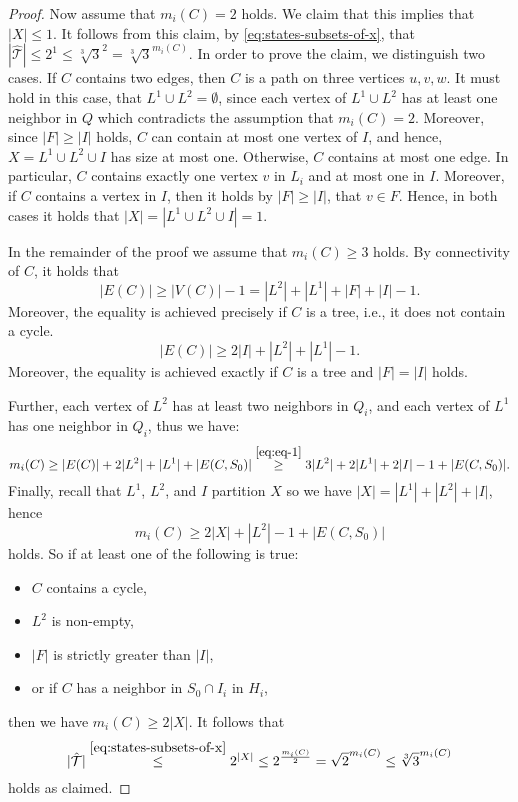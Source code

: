 \documentclass[a4paper,UKenglish,cleveref, autoref, thm-restate]{lipics-v2021}
\begin{document}
\begin{proof}
    Now assume that $m_{i}(C) = 2$ holds. We claim that this implies that $|X|\leq1$. It follows from this claim, by \cref{eq:states-subsets-of-x}, that $|\hat{\mathcal{T}}| \leq 2^1 \leq \sqrt[3]{3}^{2} = \sqrt[3]{3}^{m_{i}(C)}$.
    In order to prove the claim, we distinguish two cases. If $C$ contains two edges, then $C$ is a path on three vertices $u, v, w$. It must hold in this case, that $L^1 \cup L^2 = \emptyset$, since each vertex of $L^1\cup L^2$ has at least one neighbor in $Q$ which contradicts the assumption that $m_i(C)=2$. Moreover, since $|F|\geq |I|$ holds, $C$ can contain at most one vertex of $I$, and hence, $X = L^1\cup L^2\cup I$ has size at most one.
    Otherwise, $C$ contains at most one edge. In particular, $C$ contains exactly one vertex $v$ in $L_i$ and at most one in $I$. Moreover, if $C$ contains a vertex in $I$, then it holds by $|F|\geq |I|$, that $v\in F$. Hence, in both cases it holds that $|X| = |L^1\cup L^2\cup I| = 1$.

    In the remainder of the proof we assume that $m_{i}(C) \geq 3$ holds.
    By connectivity of $C$, it holds that 
    \begin{equation*}
        |E(C)| \geq |V(C)| - 1 = |L^2|+|L^1|+|F|+|I|-1.
    \end{equation*}
    Moreover, the equality is achieved precisely if $C$ is a tree, i.e., it does not contain a cycle.  
    \begin{equation}\label{eq:eq-1}
        |E(C)| \geq 2|I| + |L^2| + |L^1| - 1.
    \end{equation}
    Moreover, the equality is achieved exactly if $C$ is a tree and $|F| = |I|$ holds.
    
    Further, each vertex of $L^2$ has at least two neighbors in $Q_i$, and each vertex of $L^1$ has one neighbor in $Q_i$, thus we have:
    \[
        m_{i}(C) \geq |E(C)| + 2|L^2| + |L^1| + |E(C, S_0)| \stackrel{\eqref{eq:eq-1}}{\geq} 3|L^2| + 2|L^1| + 2|I| - 1  + |E(C, S_0)|. 
    \]
    Finally, recall that $L^1$, $L^2$, and $I$ partition $X$ so we have $|X| = |L^1| + |L^2| + |I|$, hence
    \begin{equation}\label{eq:eq-2}
        m_{i}(C) \geq 2|X| + |L^2| - 1  + |E(C, S_0)|
    \end{equation}
    holds.
    So if at least one of the following is true:
    \begin{itemize}
     \item 
        $C$ contains a cycle, 
     \item $L^2$ is non-empty, 
     \item $|F|$ is strictly greater than $|I|$, 
     \item or if $C$ has a neighbor in $S_0 \cap I_i$ in $H_i$,
    \end{itemize}
    then we have $m_{i}(C)\geq 2|X|$. 
    It follows that
    \[
    |\hat{\mathcal{T}}| \stackrel{\eqref{eq:states-subsets-of-x}}{\leq} 2^{|X|} \leq 2^{\frac{m_{i}(C)}{2}} = \sqrt{2}^{m_{i}(C)}\leq \sqrt[3]{3}^{m_{i}(C)}
    \]
    holds as claimed.


\end{proof}
\end{document}
